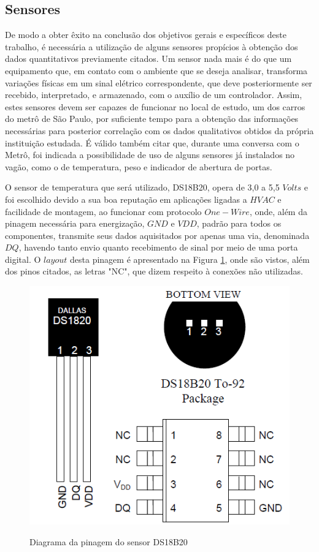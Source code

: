 \documentclass[acronym,symbols]{fei}
\begin{document}
\subsection{Sensores} \label{sensor}

De modo a obter êxito na conclusão dos objetivos gerais e específicos deste trabalho, é necessária a utilização de alguns sensores propícios à obtenção dos dados quantitativos previamente citados. Um sensor nada mais é do que um equipamento que, em contato com o ambiente que se deseja analisar, transforma variações físicas em um sinal elétrico correspondente, que deve posteriormente ser recebido, interpretado, e armazenado, com o auxílio de um controlador. Assim, estes sensores devem ser capazes de funcionar no local de estudo, um dos carros do metrô de São Paulo, por suficiente tempo para a obtenção das informações necessárias para posterior correlação com os dados qualitativos obtidos da própria instituição estudada. É válido também citar que, durante uma conversa com o Metrô, foi indicada a possibilidade de uso de alguns sensores já instalados no vagão, como o de temperatura, peso e indicador de abertura de portas.

O sensor de temperatura que será utilizado, DS18B20, opera de 3,0 a 5,5 $Volts$ e foi escolhido devido a sua boa reputação em aplicações ligadas a $HVAC$ e facilidade de montagem, ao funcionar com protocolo $One-Wire$, onde, além da pinagem necessária para energização, $GND$ e $VDD$,  padrão para todos os componentes, transmite seus dados aquisitados por apenas uma via, denominada $DQ$, havendo tanto envio quanto recebimento de sinal por meio de uma porta digital.  O $layout$ desta pinagem é apresentado na Figura \ref{fig:PinTemp}, onde são vistos, além dos pinos citados, as letras "NC", que dizem respeito à conexões não utilizadas.

\begin{figure}[!htb]
\centering
    \caption{Diagrama da pinagem do sensor DS18B20}
    \includegraphics[width=0.6\linewidth]{Imagens/PinTemp.png}
    \label{fig:PinTemp}
\end{figure}
\end{document}
